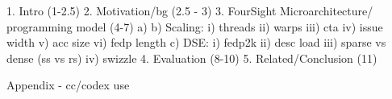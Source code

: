 
1. Intro (1-2.5)
2. Motivation/bg (2.5 - 3)
3. FourSight Microarchitecture/ programming model (4-7)
a)
b) Scaling:
    i) threads
    ii) warps
    iii) cta
    iv) issue width
    v) acc size
    vi) fedp length
c) DSE:
    i) fedp2k
    ii) desc load
    iii) sparse vs dense (ss vs rs)
    iv) swizzle
4. Evaluation (8-10)
5. Related/Conclusion (11)



Appendix - cc/codex use